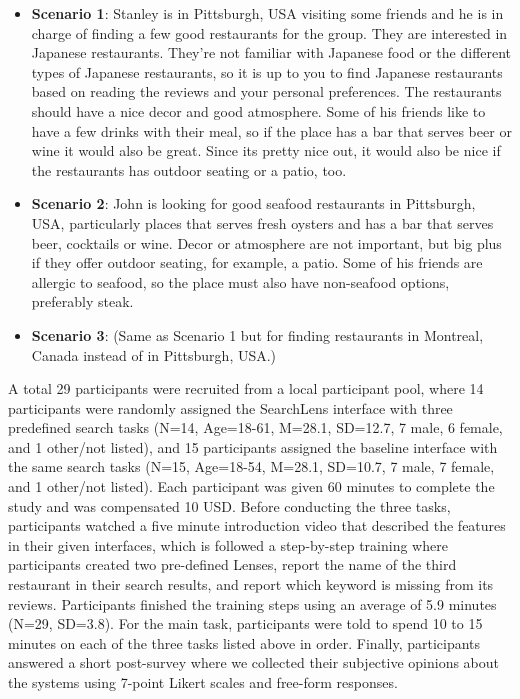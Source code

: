 \begin{itemize}
  
  
    \item \textbf{Scenario 1}: Stanley is in Pittsburgh, USA visiting some friends and he is in charge of finding a few good restaurants for the group. They are interested in Japanese restaurants. They're not familiar with Japanese food or the different types of Japanese restaurants, so it is up to you to find Japanese restaurants based on reading the reviews and your personal preferences. The restaurants should have a nice decor and good atmosphere. Some of his friends like to have a few drinks with their meal, so if the place has a bar that serves beer or wine it would also be great. Since its pretty nice out, it would also be nice if the restaurants has outdoor seating or a patio, too.
    
    \item \textbf{Scenario 2}: John is looking for good seafood restaurants in Pittsburgh, USA, particularly places that serves fresh oysters and has a bar that serves beer, cocktails or wine. Decor or atmosphere are not important, but big plus if they offer outdoor seating, for example, a patio. Some of his friends are allergic to seafood, so the place must also have non-seafood options, preferably steak.
    
    \item \textbf{Scenario 3}: (Same as Scenario 1 but for finding restaurants in Montreal, Canada instead of in Pittsburgh, USA.)
\end{itemize}

A total 29 participants were recruited from a local participant pool, where 14 participants were randomly assigned the SearchLens interface with three predefined search tasks (N=14, Age=18-61, M=28.1, SD=12.7, 7 male, 6 female, and 1 other/not listed), and 15 participants assigned the baseline interface with the same search tasks (N=15, Age=18-54, M=28.1, SD=10.7, 7 male, 7 female, and 1 other/not listed). Each participant was given 60 minutes to complete the study and was compensated 10 USD. Before conducting the three tasks, participants watched a five minute introduction video that described the features in their given interfaces, which is followed a step-by-step training where participants created two pre-defined Lenses, report the name of the third restaurant in their search results, and report which keyword is missing from its reviews. Participants finished the training steps using an average of 5.9 minutes (N=29, SD=3.8). For the main task, participants were told to spend 10 to 15 minutes on each of the three tasks listed above in order. Finally, participants answered a short post-survey where we collected their subjective opinions about the systems using 7-point Likert scales and free-form responses.


